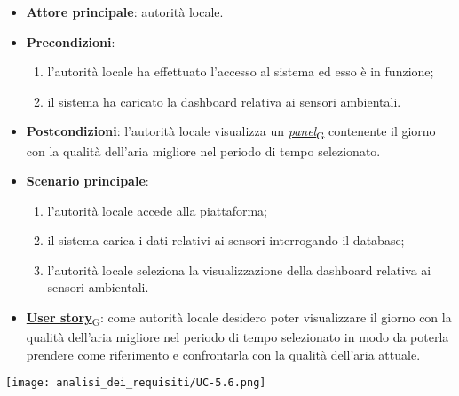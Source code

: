 \begin{itemize}
	\item \textbf{Attore principale}: autorità locale.
	\item \textbf{Precondizioni}:
	      \begin{enumerate}
		      \item l'autorità locale ha effettuato l'accesso al sistema ed esso è in funzione;
		      \item il sistema ha caricato la dashboard relativa ai sensori ambientali.
	      \end{enumerate}
	\item \textbf{Postcondizioni}: l'autorità locale visualizza un \href{https://7last.github.io/docs/pb/documentazione-interna/glossario\#panel}{\textit{panel}\textsubscript{G}} contenente il giorno con la qualità dell'aria migliore nel periodo di tempo selezionato.
	\item \textbf{Scenario principale}:
	      \begin{enumerate}
		      \item l'autorità locale accede alla piattaforma;
		      \item il sistema carica i dati relativi ai sensori interrogando il database;
		      \item l'autorità locale seleziona la visualizzazione della dashboard relativa ai sensori ambientali.
	      \end{enumerate}
	\item \href{https://7last.github.io/docs/pb/documentazione-interna/glossario\#user-story}{\textbf{User story}\textsubscript{G}}:
	      come autorità locale desidero poter visualizzare il giorno con la qualità dell'aria migliore nel periodo di tempo selezionato
	      in modo da poterla prendere come riferimento e confrontarla con la qualità dell'aria attuale.
\end{itemize}
\begin{center}
	\texttt{[image: analisi\_dei\_requisiti/UC-5.6.png]}
\end{center}

